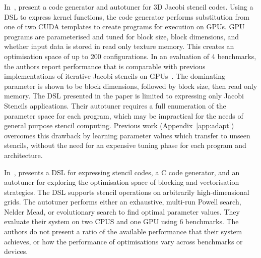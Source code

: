 In~\cite{Zhang2013a}, \citeauthor{Zhang2013a} present a code generator and autotuner for 3D Jacobi stencil codes. Using a DSL to express kernel functions, the code generator performs substitution from one of two CUDA templates to create programs for execution on GPUs. GPU programs are parameterised and tuned for block size, block dimensions, and whether input data is stored in read only texture memory. This creates an optimisation space of up to 200 configurations. In an evaluation of 4 benchmarks, the authors report performance that is comparable with previous implementations of iterative Jacobi stencils on GPUs~\cite{Holewinski2012, Phillips2010}. The dominating parameter is shown to be block dimensions, followed by block size, then read only memory. The DSL presented in the paper is limited to expressing only Jacobi Stencils applications. Their autotuner requires a full enumeration of the parameter space for each program, which may be impractical for the needs of general purpose stencil computing. Previous work (Appendix~\ref{app:adapt}) overcomes this drawback by learning parameter values which transfer to unseen stencils, without the need for an expensive tuning phase for each program and architecture.

In~\cite{Christen2011}, \citeauthor{Christen2011} presents a DSL for expressing stencil codes, a C code generator, and an autotuner for exploring the optimisation space of blocking and vectorisation strategies. The DSL supports stencil operations on arbitrarily high-dimensional grids. The autotuner performs either an exhaustive, multi-run Powell search, Nelder Mead, or evolutionary search to find optimal parameter values. They evaluate their system on two CPUS and one GPU using 6 benchmarks. The authors do not present a ratio of the available performance that their system achieves, or how the performance of optimisations vary across benchmarks or devices.

